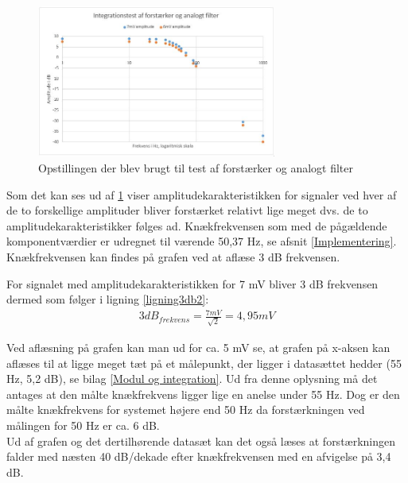 \begin{figure}[H]
	\centering
	\includegraphics[width=0.7\textwidth]{Figurer/Hardware/IntegrationstestForstaerkerFilter2}
	\caption{Opstillingen der blev brugt til test af forstærker og analogt filter}
	\label{fig:ForstaerkerFilterGraf}
\end{figure}

Som det kan ses ud af \ref{fig:ForstaerkerFilterGraf} viser amplitudekarakteristikken for signaler ved hver af de to forskellige amplituder bliver forstærket relativt lige meget dvs. de to amplitudekarakteristikker følges ad.
Knækfrekvensen som med de pågældende komponentværdier er udregnet til værende 50,37 Hz, se afsnit \ref{Implementering}. Knækfrekvensen kan findes på grafen ved at aflæse 3 dB frekvensen.

For signalet med amplitudekarakteristikken for 7 mV bliver 3 dB frekvensen dermed som følger i ligning \ref{ligning3db2}:\\
\begin{align}
	3dB_{frekvens}=\frac{7mV}{\sqrt{2}}=4,95mV
	\label{ligning3db2}
\end{align}


Ved aflæsning på grafen kan man ud for ca. 5 mV se, at grafen på x-aksen kan aflæses til at ligge meget tæt på et målepunkt, der ligger i datasættet hedder (55 Hz, 5,2 dB), se bilag \ref{Modul og integration}. Ud fra denne oplysning må det antages at den målte knækfrekvens ligger lige en anelse under 55 Hz. Dog er den målte knækfrekvens for systemet højere end 50 Hz da forstærkningen ved målingen for 50 Hz er ca. 6 dB.\\
Ud af grafen og det dertilhørende datasæt kan det også læses at forstærkningen falder med næsten 40 dB/dekade efter knækfrekvensen med en afvigelse på 3,4 dB.

